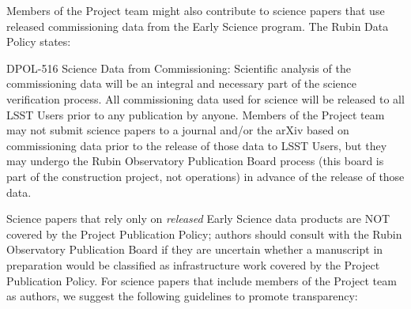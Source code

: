 \documentclass[SE,authoryear,toc]{lsstdoc}
\begin{document}
Members of the Project team might also contribute to science papers that use released commissioning data from the Early Science program.
The Rubin Data Policy  states:

\begin{emph}
  {DPOL-516 Science Data from Commissioning: Scientific analysis of the commissioning data will be an integral and necessary part of the science verification process.
  All commissioning data used for science will be released to all LSST Users prior to any publication by anyone.
  Members of the Project team may not submit science papers to a journal and/or the arXiv based on commissioning data prior to the release of those data to LSST Users, but they may undergo the Rubin Observatory Publication Board process (this board is part of the construction project, not operations) in advance of the release of those data.}
\end{emph}

Science papers that rely only on \emph{released} Early Science data products are NOT covered by the Project Publication Policy; authors should consult with the Rubin Observatory Publication Board if they are uncertain whether a manuscript in preparation would be classified as infrastructure work covered by the Project Publication Policy.
For science papers that include members of the Project team as authors, we suggest the following guidelines to promote transparency:
\end{document}
